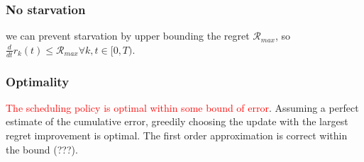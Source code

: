 \subsubsection{No starvation} we can prevent starvation by upper bounding the regret $\mathcal{R}_{max}$, so $\frac{d}{dt}r_k(t) \le \mathcal{R}_{max} \forall k, t \in [0, T)$. 

\subsubsection{Optimality} \textcolor{red}{The scheduling policy is optimal within some bound of error}. Assuming a perfect estimate of the cumulative error, greedily choosing the update with the largest regret improvement is optimal. The first order approximation is correct within the bound (???).  





